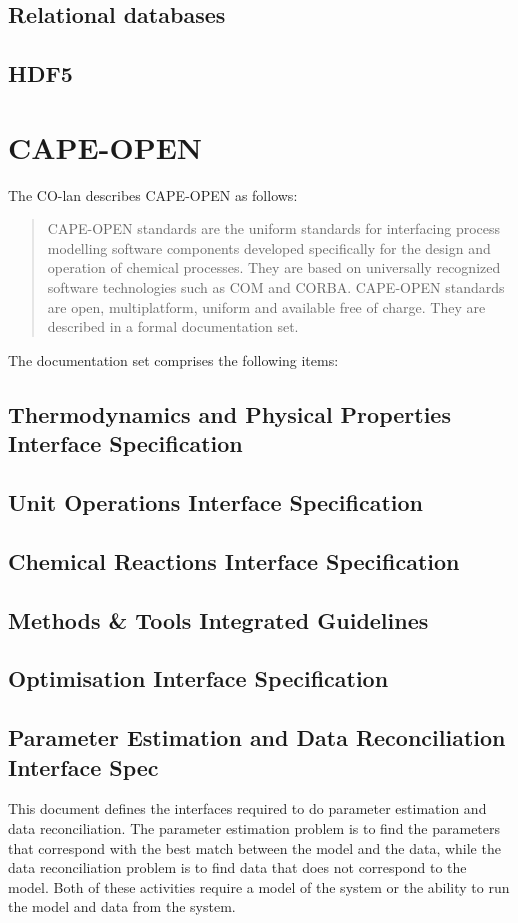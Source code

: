 \subsection{Relational databases}
\subsection{HDF5}

\section{CAPE-OPEN}
The CO-lan describes CAPE-OPEN as follows:
\begin{quote}
CAPE-OPEN standards are the uniform standards for interfacing process modelling software components developed specifically for the design and operation of chemical processes. 
They are based on universally recognized software technologies such as COM and CORBA. 
CAPE-OPEN standards are open, multiplatform, uniform and available free of charge. 
They are described in a formal documentation set.
\end{quote}

The documentation set comprises the following items:
\subsection{Thermodynamics and Physical Properties Interface Specification}

\subsection{Unit Operations Interface Specification}

\subsection{Chemical Reactions Interface Specification}

\subsection{Methods \& Tools Integrated Guidelines}

\subsection{Optimisation Interface Specification}

\subsection{Parameter Estimation and Data Reconciliation Interface Spec}
This document defines the interfaces required to do parameter estimation and data reconciliation.  
The parameter estimation problem is to find the parameters that correspond with the best match between the model and the data, while the data reconciliation problem is to find data that does not correspond to the model.  
Both of these activities require a model of the system or the ability to run the model and data from the system.  

